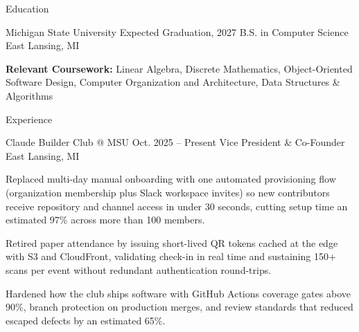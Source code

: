 \documentclass[
	11pt
]{../../resume}
\begin{document}
	\begin{rSection}{E}{ducation}
		\begin{rSectionEntry}
			{Michigan State University}
			{Expected Graduation, 2027}
			{B.S. in Computer Science}
			{}
			{East Lansing, MI}

			\item \textbf{Relevant Coursework:} Linear Algebra, Discrete Mathematics, Object-Oriented Software Design, Computer Organization and Architecture, Data Structures \& Algorithms
		\end{rSectionEntry}
	\end{rSection}

	\begin{rSection}{E}{xperience}
		\begin{rSectionEntry}
			{Claude Builder Club @ MSU}
			{Oct. 2025 -- Present}
			{Vice President \& Co-Founder}
			{}
			{East Lansing, MI}

			\item Replaced multi-day manual onboarding with one automated provisioning flow (organization membership plus Slack workspace invites) so new contributors receive repository and channel access in under 30 seconds, cutting setup time an estimated 97\% across more than 100 members.
			\item Retired paper attendance by issuing short-lived QR tokens cached at the edge with S3 and CloudFront, validating check-in in real time and sustaining 150+ scans per event without redundant authentication round-trips.
			\item Hardened how the club ships software with GitHub Actions coverage gates above 90\%, branch protection on production merges, and review standards that reduced escaped defects by an estimated 65\%.
		\end{rSectionEntry}
	\end{rSection}
\end{document}

